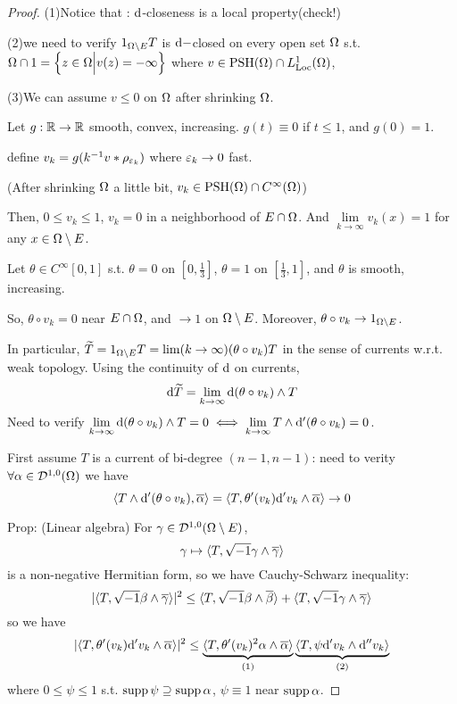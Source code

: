 \begin{proof}
(1)Notice that : $\mathrm{d}$-closeness is a local property(check!)

(2)we need to verify $1_{\Omega\setminus E}T$ is $\mathrm{d}-$closed on
every open set $\Omega$ s.t. $\Omega\cap 1=
\Big\{ z\in\Omega \Big| v(z)=-\infty \Big\}$ where $v\in\operatorname{PSH}(\Omega)\cap L^1_{\operatorname{Loc}}(\Omega)$,

(3)We can assume $v\leq 0$ on $\Omega$ after shrinking $\Omega$.

Let $g:\mathbb{R}\to\mathbb{R}$ smooth, convex, increasing. $g(t)\equiv 0$ if $t\leq 1$,
and $g(0)=1$. %

define $v_k=g(k^{-1}v*\rho_{\varepsilon_k})$ where $\varepsilon_k\to 0$ fast.

(After shrinking $\Omega$ a little bit, $v_k\in\operatorname{PSH}(\Omega)\cap C^\infty(\Omega)$)

Then, $0\leq v_k\leq 1$, $v_k=0$ in a neighborhood of $E\cap\Omega$.
And $\lim\limits_{k\to\infty}v_k(x)=1$ for any $x\in\Omega\setminus E$.

Let $\theta\in C^\infty[0,1]$ s.t.
$\theta =0$ on $[0,\frac{1}{3}]$, $\theta=1$ on $[\frac{1}{3},1]$,
 and $\theta$ is smooth, increasing.

So, $\theta\circ v_k= 0$ near $E\cap \Omega $, and $\to 1$ on $\Omega\setminus E$.
Moreover, $\theta\circ v_k\to 1_{\Omega\setminus E}$.

In particular, $\widetilde{T}=1_{\Omega\setminus E}T
=\lim\limits(k\to\infty)(\theta\circ v_k)T$
in the sense of currents w.r.t. weak topology.
Using the continuity of $\mathrm{d}$ on currents,
$$
  \mathrm{d}\widetilde{T}
=\lim_{k\to\infty}\mathrm{d}(\theta\circ v_k)\wedge T
$$
Need to verify $\lim\limits_{k\to\infty}\mathrm{d}(\theta\circ v_k)\wedge T=0
\iff\lim\limits_{k\to\infty}T\wedge\mathrm{d}'(\theta\circ v_k)=0$.

First assume $T$ is a current of bi-degree $(n-1,n-1)$:
need to verity $\forall \alpha\in\mathcal{D}^{1,0}(\Omega)$ we have
$$
  \langle T\wedge\mathrm{d}'(\theta\circ v_k),\overline{\alpha} \rangle
=
  \langle T,\theta'(v_k)\mathrm{d}'v_k\wedge\overline{\alpha} \rangle\to 0
$$

Prop: (Linear algebra) For $\gamma\in\mathcal{D}^{1,0}(\Omega\setminus E)$,
$$\gamma\mapsto\langle T,\sqrt{-1}\gamma\wedge\overline{\gamma} \rangle$$
is a non-negative Hermitian form, so we have Cauchy-Schwarz inequality:
$$
  |\langle T,\sqrt{-1}\beta\wedge\overline{\gamma} \rangle|^2
\leq
  \langle T,\sqrt{-1}\beta\wedge\overline{\beta} \rangle
  +\langle T,\sqrt{-1}\gamma\wedge\overline{\gamma} \rangle
$$
so we have
$$
  |\langle T,\theta'(v_k)\mathrm{d}'v_k\wedge\overline{\alpha} \rangle|^2
\leq
  \underbrace{
  \langle T,\theta'(v_k)^2\alpha\wedge\overline{\alpha} \rangle
  }_{(1)}
  \underbrace{
  \langle T,\psi\mathrm{d}'v_k\wedge\mathrm{d}''v_k \rangle
  }_{(2)}
$$
where $0\leq\psi\leq 1$ s.t. $\operatorname{supp}\psi\supseteq\operatorname{supp}\alpha$, $\psi\equiv 1$
near $\operatorname{supp}\alpha$.


\end{proof}
